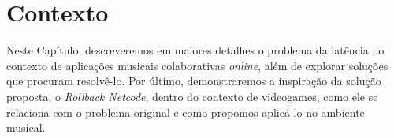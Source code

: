 \chapter{Contexto}

Neste Capítulo, descreveremos em maiores detalhes o problema da latência no contexto de aplicações musicais colaborativas \textit{online}, além de explorar soluções que procuram resolvê-lo. Por último, demonstraremos a inspiração da solução proposta, o \textit{Rollback Netcode}, dentro do contexto de videogames, como ele se relaciona com o problema original e como propomos aplicá-lo no ambiente musical.
